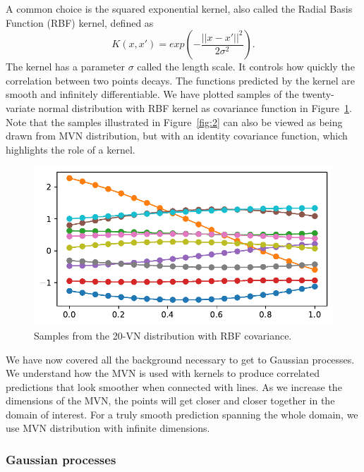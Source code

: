 A common choice is the squared exponential kernel, also called the Radial Basis Function (RBF) kernel, defined as \[ K(x, x') = exp \left( -  \frac{||x - x'||^2} {2 \sigma^2}\right). \] The kernel has a parameter $\sigma$ called the length scale. It controls how quickly the correlation between two points decays. The functions predicted by the kernel are smooth and infinitely differentiable. We have plotted samples of the twenty-variate normal distribution with RBF kernel as covariance function in Figure~\ref{fig:f3}. Note that the samples illustrated in Figure~\ref{fig:2} can also be viewed as being drawn from MVN distribution, but with an identity covariance function, which highlights the role of a kernel.

\begin{figure}
    \centering
    \includegraphics[scale=0.8]{img/20_gaussians_with_prior.pdf}
    \caption{Samples from the 20-VN distribution with RBF covariance.}
    \label{fig:f3}
\end{figure}


We have now covered all the background necessary to get to Gaussian processes. We understand how the MVN is used with kernels to produce correlated predictions that look smoother when connected with lines. As we increase the dimensions of the MVN, the points will get closer and closer together in the domain of interest. For a truly smooth prediction spanning the whole domain, we use MVN distribution with infinite dimensions. %


\subsubsection{Gaussian processes}

